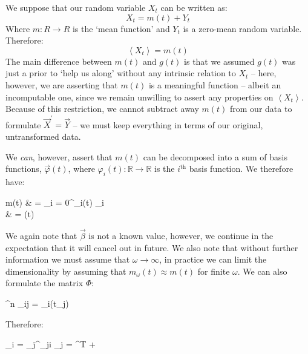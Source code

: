 \documentclass[]{article}
\def\llangle{\left\langle}
\def\rrangle{\right\rangle}
\newcommand\E[1]{\llangle #1 \rrangle}
\begin{document}
		We suppose that our random variable $X_t$ can be written as:
		\begin{equation}
			X_t = m(t) + Y_t
		\end{equation}
		Where $m:R \to R$ is the `mean function' and $Y_t$ is a zero-mean random variable. Therefore:
		\begin{equation}
			\E{X_t} = m(t)
		\end{equation}
		The main difference between $m(t)$ and $g(t)$ is that we assumed $g(t)$ was just a prior to `help us along' without any intrinsic relation to $X_t$ -- here, however, we are asserting that $m(t)$ is a meaningful function -- albeit an incomputable one, since we remain unwilling to assert any properties on $\E{X_t}$. Because of this restriction, we cannot subtract away $m(t)$ from our data to formulate $\vec{X}^\prime = \vec{Y}$ -- we must keep everything in terms of our original, untransformed data.

		We \textit{can}, however, assert that $m(t)$ can be decomposed into a sum of basis functions, $\vec{\varphi}(t)$, where $\varphi_i(t): \mathbb{R} \to \mathbb{R}$ is the $i^\text{th}$ basis function. We therefore have:
		\begin{spalign}
			m(t) & = \sum_{i = 0}^\omega \phi_i(t) \beta_i
			\\
			& = \vec{\beta} \cdot \vec{\varphi}(t)
		\end{spalign}
		We again note that $\vec{\beta}$ is not a known value, however, we continue in the expectation that it will cancel out in future. We also note that without further information we must assume that $\omega \to \infty$, in practice we can limit the dimensionality by assuming that $m_\omega(t) \approx m(t)$ for finite $\omega$. We can also formulate the matrix $\Phi$:
		\begin{spalign}
			\Phi \in {}^{\omega\times n}  \Phi_{ij} = \varphi_i(t_j)
		\end{spalign}
		Therefore:
		\begin{spalign}
			_i = \sum_{j}^\omega \Phi_{ji} \beta_j \LLR {} = \Phi^T \vec{\beta} + \vec{Y}
		\end{spalign}
		
\end{document}

